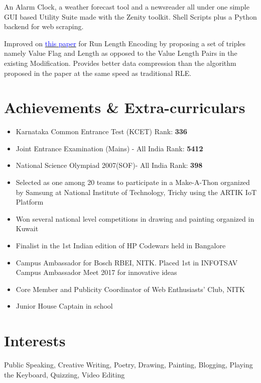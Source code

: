 \documentclass[11pt,a4paper,roman]{moderncv}        %
\begin{document}
An Alarm Clock, a weather forecast tool and a newsreader all under one simple GUI based Utility Suite made  with the Zenity toolkit. Shell Scripts plus a Python backend for web scraping.



Improved on {\href{http://ieeexplore.ieee.org/stamp/stamp.jsp?arnumber=6148417}{\textcolor{blue}{this paper}}} for Run Length Encoding by proposing a set of triples namely Value Flag and Length as opposed to the Value Length Pairs in the existing Modification. Provides better data compression than the algorithm proposed in the paper at the same speed as traditional RLE.



\section{\small{Achievements \& Extra-curriculars}}

\begin{itemize}

\item{Karnataka Common Entrance Test (KCET) Rank: \textbf{336}}
\item{Joint Entrance Examination (Mains) - All India Rank: \textbf{5412}} 
\item{National Science Olympiad 2007(SOF)-  All India Rank: \textbf{398}}   
\item{Selected as one among 20 teams to participate in a Make-A-Thon organized by Samsung at National Institute of Technology, Trichy using the ARTIK IoT Platform}
\item{Won several national level competitions in drawing and painting organized in Kuwait}
\item{Finalist in the 1st Indian edition of HP Codewars held in Bangalore}
\item{Campus Ambassador for Bosch RBEI, NITK. Placed 1st in INFOTSAV Campus Ambassador Meet 2017 for innovative ideas}
\item{Core Member and Publicity Coordinator of Web Enthusiasts' Club, NITK}
\item{Junior House Captain in school}
\end{itemize}


\section{\small{Interests}}
Public Speaking, Creative Writing, Poetry, Drawing, Painting, Blogging, Playing the Keyboard, Quizzing, Video Editing
\end{document}
